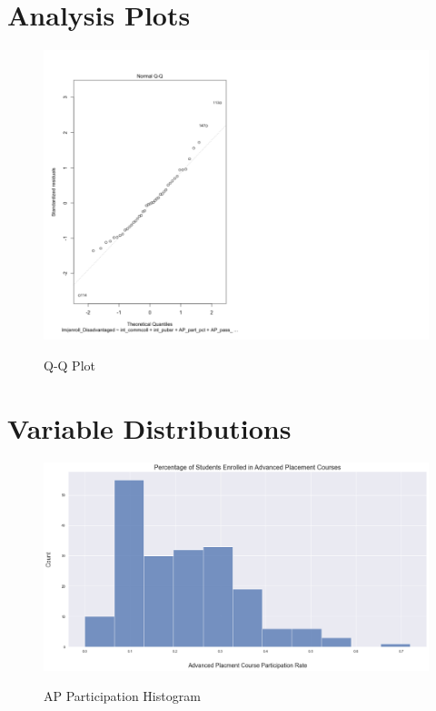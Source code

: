 \documentclass[stu, 12pt, floatsintext]{apa7}
\begin{document}
\section{Analysis Plots}
\begin{figure}
    \caption{Q-Q Plot}
    \includegraphics[width=17cm]{QQPlot.png}
    \label{fig13}
\end{figure}

\section{Variable Distributions}
\begin{figure}
     \caption{AP Participation Histogram}
     \includegraphics[width=17cm]{AP_part_pct_histogram.png}
     \label{fig5}
\end{figure}
\end{document}
